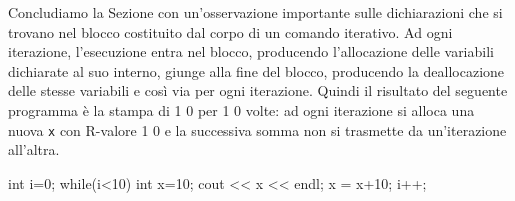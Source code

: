 Concludiamo la Sezione con un'osservazione importante sulle dichiarazioni che si trovano nel blocco costituito dal corpo di un comando iterativo.
Ad ogni iterazione, l'esecuzione entra nel blocco, producendo l'allocazione delle variabili dichiarate al suo interno, giunge alla fine del blocco, producendo la deallocazione delle stesse variabili e così via per ogni iterazione.
Quindi il risultato del seguente programma è la stampa di 1 0 per 1 0 volte: ad ogni iterazione si alloca una nuova \texttt{x} con R-valore 1 0 e la successiva somma non si trasmette da un'iterazione all'altra.

\begin{codice}

int i=0;
while(i<10) {
  int x=10;
  cout << x << endl;
  x = x+10;
  i++;
}
\end{codice}

\newpage